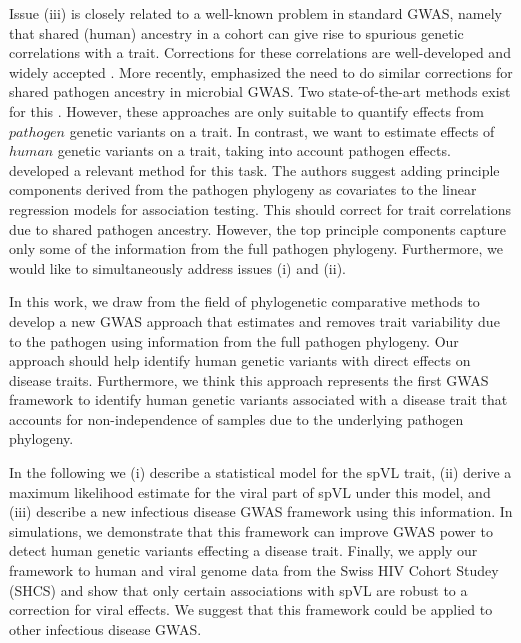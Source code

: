 \documentclass[]{article}
\begin{document}
\begin{doublespace}
Issue (iii) is closely related to a well-known problem in standard GWAS, namely that shared (human) ancestry in a cohort can give rise to spurious genetic correlations with a trait. Corrections for these correlations are well-developed and widely accepted  \parencite{Astle2009, Price2006}. More recently, \cite{Power2016} emphasized the need to do similar corrections for shared pathogen ancestry in microbial GWAS. Two state-of-the-art methods exist for this \cite{Earle2016, collins_phylogenetic_nodate}. 
However, these approaches are only suitable to quantify effects from $pathogen$ genetic variants on a trait. In contrast, we want to estimate effects of $human$ genetic variants on a trait, taking into account pathogen effects. \parencite{Naret2018} developed a relevant method for this task. The authors suggest adding principle components derived from the pathogen phylogeny as covariates to the linear regression models for association testing. This should correct for trait correlations due to shared pathogen ancestry. However, the top principle components capture only some of the information from the full pathogen phylogeny. Furthermore, we would like to simultaneously address issues (i) and (ii).

In this work,  we draw from the field of phylogenetic comparative methods to develop a new GWAS approach that estimates and removes trait variability due to the pathogen using information from the full pathogen phylogeny. Our approach should help identify human genetic variants with direct effects on disease traits. Furthermore, we think this approach represents the first GWAS framework to identify human genetic variants associated with a disease trait that accounts for non-independence of samples due to the underlying pathogen phylogeny. 

In the following we (i) describe a statistical model for the spVL trait, (ii) derive a maximum likelihood estimate for the viral part of spVL under this model, and (iii) describe a new infectious disease GWAS framework using this information. In simulations, we demonstrate that this framework can improve GWAS power to detect human genetic variants effecting a disease trait. Finally, we apply our framework to human and viral genome data from the Swiss HIV Cohort Studey (SHCS) and show that only certain associations with spVL are robust to a correction for viral effects. We suggest that this framework could be applied to other infectious disease GWAS.


\end{doublespace}
\end{document}
